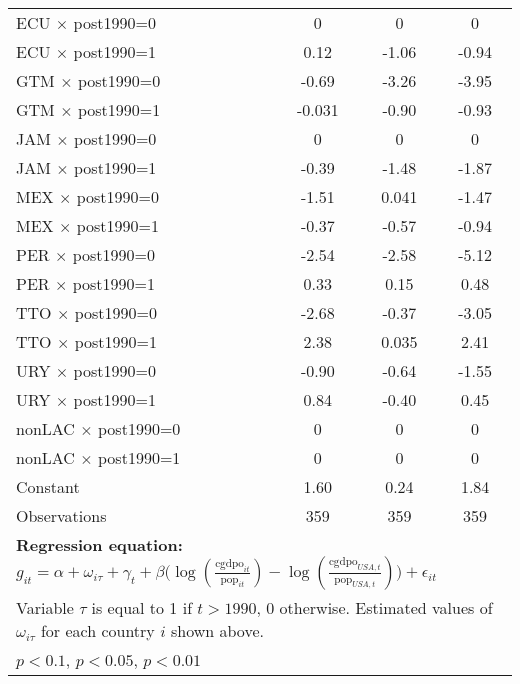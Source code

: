 \begin{sidewaystable}[htbp]
\begin{tabular}{l*{3}{c}}
ECU $\times$ post1990=0&        0         &        0         &        0         \\
ECU $\times$ post1990=1&     0.12         &    -1.06\sym{**} &    -0.94\sym{**} \\
GTM $\times$ post1990=0&    -0.69\sym{***}&    -3.26\sym{***}&    -3.95\sym{***}\\
GTM $\times$ post1990=1&   -0.031         &    -0.90\sym{**} &    -0.93\sym{*}  \\
JAM $\times$ post1990=0&        0         &        0         &        0         \\
JAM $\times$ post1990=1&    -0.39\sym{**} &    -1.48\sym{***}&    -1.87\sym{***}\\
MEX $\times$ post1990=0&    -1.51\sym{***}&    0.041         &    -1.47\sym{*}  \\
MEX $\times$ post1990=1&    -0.37\sym{**} &    -0.57         &    -0.94\sym{*}  \\
PER $\times$ post1990=0&    -2.54\sym{***}&    -2.58\sym{***}&    -5.12\sym{***}\\
PER $\times$ post1990=1&     0.33\sym{**} &     0.15         &     0.48         \\
TTO $\times$ post1990=0&    -2.68\sym{***}&    -0.37         &    -3.05\sym{***}\\
TTO $\times$ post1990=1&     2.38\sym{***}&    0.035         &     2.41\sym{***}\\
URY $\times$ post1990=0&    -0.90\sym{***}&    -0.64         &    -1.55\sym{***}\\
URY $\times$ post1990=1&     0.84\sym{***}&    -0.40\sym{*}  &     0.45         \\
nonLAC $\times$ post1990=0&        0         &        0         &        0         \\
nonLAC $\times$ post1990=1&        0         &        0         &        0         \\
Constant        &     1.60\sym{***}&     0.24         &     1.84         \\
\midrule
Observations    &      359         &      359         &      359         \\
\bottomrule
\multicolumn{4}{l}{\footnotesize \textbf{Regression equation:} \(g_{it} = \alpha + \omega_{i\tau} + \gamma_t + \beta \big(\log (\frac{\textrm{cgdpo}_{it}}{\textrm{pop}_{it}} ) - \log (\frac{\textrm{cgdpo}_{USA,t}}{\textrm{pop}_{USA,t}}  ) \big) + \epsilon_{it}\)}\\
\multicolumn{4}{l}{\footnotesize Variable \(\tau\) is equal to 1 if \(t > 1990\), 0 otherwise. Estimated values of \(\omega_{i\tau}\) for each country \(i\) shown above.}\\
\multicolumn{4}{l}{\footnotesize \sym{*} \(p<0.1\), \sym{**} \(p<0.05\), \sym{***} \(p<0.01\)}\\
\end{tabular}
\end{sidewaystable}
